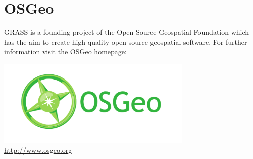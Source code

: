 \documentclass[notumble,a4paper,10pt,nofoldmark]{leaflet}
\begin{document}
\vfill
\section{OSGeo}

GRASS is a founding project of the Open Source Geospatial Foundation which has the aim to create high quality open source geospatial software. For further information visit the OSGeo homepage:
\begin{center}
\includegraphics[width=0.7\textwidth]{OSGeo_CMYK}\\
\url{http://www.osgeo.org}
\end{center}
\end{document}
